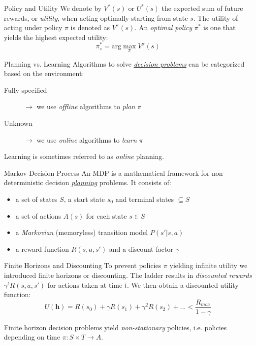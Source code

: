\documentclass{cognito}
\begin{document}
\begin{note}{Policy and Utility}
	We denote by $V^*(s)$ or $U^*(s)$ the expected sum of future rewards, or \emph{utility}, when acting optimally starting from state $s$.
	The utility of acting under policy $\pi$ is denoted as $V^\pi(s)$.
	An \emph{optimal policy} $\pi^*$ is one that yields the highest expected utility:
	$$
		\pi^*_s = \text{arg}\max_\pi V^\pi(s)
	$$
	\vspace{-10pt}
\end{note}

\begin{note}{Planning vs. Learning}
	Algorithms to solve \hyperref[note:Stochastic Decision Problems]{\it decision problems} can be categorized based on the environment:
	\begin{description}
		\item[Fully specified] $\to$ we use \emph{offline} algorithms to \emph{plan} $\pi$
		\item[Unknown] $\to$ we use \emph{online} algorithms to \emph{learn} $\pi$
	\end{description}
	\begin{remark} Learning is sometimes referred to as \emph{online} planning.\end{remark}
	\vspace{-5pt}
\end{note}

\begin{note}{Markov Decision Process}
	An MDP is a mathematical framework for non-deterministic decision \hyperref[note:Planning vs. Learning]{\it planning} problems.
	It consists of:
	\begin{itemize}
		\item a set of states $S$, a start state $s_0$ and terminal states $\subseteq S$
		\item a set of actions $A(s)$ for each state $s \in S$
		\item a \emph{Markovian} (memoryless) transition model $P(s' | s, a)$
		\item a reward function $R(s,a,s')$ and a discount factor $\gamma$
	\end{itemize}
\end{note}

\begin{note}{Finite Horizons and Discounting}
	To prevent policies $\pi$ yielding infinite utility we introduced finite horizons or discounting.
	The ladder results in \emph{discounted rewards} $\gamma^t R(s, a, s')$ for actions taken at time $t$.
	We then obtain a discounted utility function:
	$$
		U(\mathbf{h}) = R(s_0) + \gamma R(s_1) + \gamma^2 R(s_2) + ... < \frac{R_{max}}{1 - \gamma}
	$$
	\begin{remark}
		Finite horizon decision problems yield \emph{non-stationary} policies, i.e.
		policies depending on time $\pi : S \times T \to A$.
	\end{remark}
	\vspace{-5pt}
\end{note}
\end{document}
